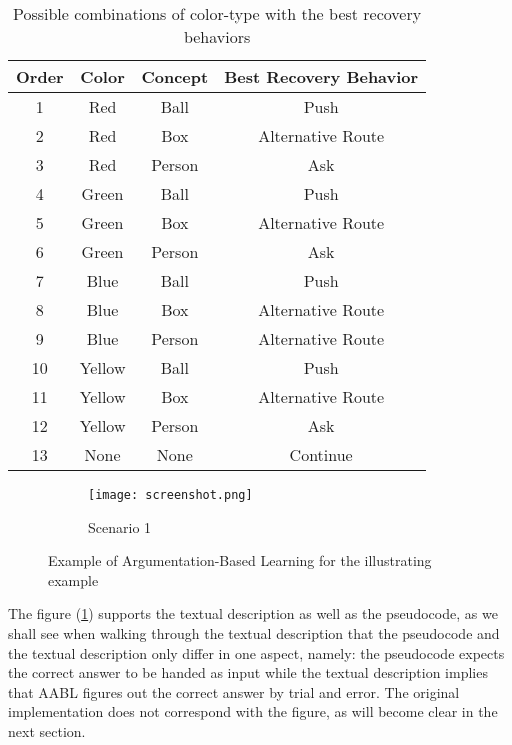 \documentclass{article}
\begin{document}
\begin{table}[H]
\begin{center}
\caption{Possible combinations of color-type with the best recovery behaviors}
\label{tab:combinations}
\begin{tabular}{|c|c|c|c|}
\hline Order & Color & Concept & Best Recovery Behavior \\
\hline \hline 1 & Red & Ball & Push \\
\hline 2 & Red & Box & Alternative Route \\
\hline 3 & Red & Person & Ask \\
\hline 4 & Green & Ball & Push \\
\hline 5 & Green & Box & Alternative Route \\
\hline 6 & Green & Person & Ask \\
\hline 7 & Blue & Ball & Push \\
\hline 8 & Blue & Box & Alternative Route \\
\hline 9 & Blue & Person & Alternative Route \\
\hline 10 & Yellow & Ball & Push \\
\hline 11 & Yellow & Box & Alternative Route \\
\hline 12 & Yellow & Person & Ask \\
\hline 13 & None & None & Continue \\
\hline
\end{tabular}
\end{center}
\end{table}
\begin{figure}[H]
    \centering
    \begin{subfigure}[b]{\textwidth}
        \texttt{[image: screenshot.png]}
        \caption{Scenario 1}
    \end{subfigure}
    \caption{Example of Argumentation-Based Learning for the illustrating
example}
    \label{fig:exampleofABL}
\end{figure}
\noindent
The figure (\ref{fig:exampleofABL}) supports the textual description as well as the pseudocode, as we shall see when walking through the textual description that the pseudocode and the textual description only differ in one aspect, namely: the pseudocode expects the correct answer to be handed as input while the textual description implies that AABL figures out the correct answer by trial and error. The original implementation does not correspond with the figure, as will become clear in the next section.
\end{document}
